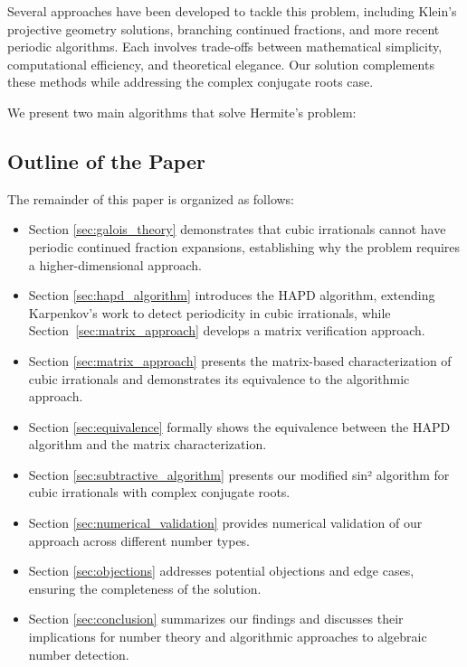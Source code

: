 Several approaches have been developed to tackle this problem, including Klein's projective geometry solutions, branching continued fractions, and more recent periodic algorithms. Each involves trade-offs between mathematical simplicity, computational efficiency, and theoretical elegance. Our solution complements these methods while addressing the complex conjugate roots case.

We present two main algorithms that solve Hermite's problem:

\subsection{Outline of the Paper}

The remainder of this paper is organized as follows:

\begin{itemize}
    \item Section \ref{sec:galois_theory} demonstrates that cubic irrationals cannot have periodic continued fraction expansions, establishing why the problem requires a higher-dimensional approach.
    
    \item Section \ref{sec:hapd_algorithm} introduces the HAPD algorithm, extending Karpenkov's work to detect periodicity in cubic irrationals, while Section~\ref{sec:matrix_approach} develops a matrix verification approach.
    
    \item Section \ref{sec:matrix_approach} presents the matrix-based characterization of cubic irrationals and demonstrates its equivalence to the algorithmic approach.
    
    \item Section \ref{sec:equivalence} formally shows the equivalence between the HAPD algorithm and the matrix characterization.
    
    \item Section \ref{sec:subtractive_algorithm} presents our modified sin² algorithm for cubic irrationals with complex conjugate roots.
    
    \item Section \ref{sec:numerical_validation} provides numerical validation of our approach across different number types.
    
    \item Section \ref{sec:objections} addresses potential objections and edge cases, ensuring the completeness of the solution.
    
    \item Section \ref{sec:conclusion} summarizes our findings and discusses their implications for number theory and algorithmic approaches to algebraic number detection.
\end{itemize}

